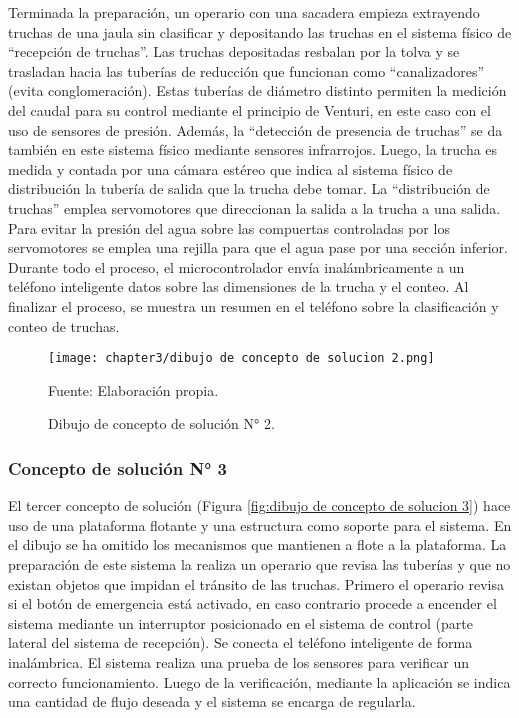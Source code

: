 Terminada la preparación, un operario con una sacadera empieza extrayendo truchas de una jaula sin clasificar y depositando las truchas en el sistema físico de “recepción de truchas”. Las truchas depositadas resbalan por la tolva y se trasladan hacia las tuberías de reducción que funcionan como “canalizadores” (evita conglomeración). Estas tuberías de diámetro distinto permiten la medición del caudal para su control mediante el principio de Venturi, en este caso con el uso de sensores de presión. Además, la “detección de presencia de truchas” se da también en este sistema físico mediante sensores infrarrojos. Luego, la trucha es medida y contada por una cámara estéreo que indica al sistema físico de distribución la tubería de salida que la trucha debe tomar. La “distribución de truchas” emplea servomotores que direccionan la salida a la trucha a una salida. Para evitar la presión del agua sobre las compuertas controladas por los servomotores se emplea una rejilla para que el agua pase por una sección inferior. 
Durante todo el proceso, el microcontrolador envía inalámbricamente a un teléfono inteligente datos sobre las dimensiones de la trucha y el conteo. Al finalizar el proceso, se muestra un resumen en el teléfono sobre la clasificación y conteo de truchas.

\begin{figure}[H]
	\centering
	\texttt{[image: chapter3/dibujo de concepto de solucion 2.png]}
	\caption{Dibujo de concepto de solución N° 2.}
	Fuente: Elaboración propia.
	\label{fig:dibujo de concepto de solucion 2}
\end{figure}

\subsubsection{Concepto de solución N° 3}

El tercer concepto de solución (Figura \ref{fig:dibujo de concepto de solucion 3}) hace uso de una plataforma flotante y una estructura como soporte para el sistema. En el dibujo se ha omitido los mecanismos que mantienen a flote a la plataforma. La preparación de este sistema la realiza un operario que revisa las tuberías y que no existan objetos que impidan el tránsito de las truchas. Primero el operario revisa si el botón de emergencia está activado, en caso contrario procede a encender el sistema mediante un interruptor posicionado en el sistema de control (parte lateral del sistema de recepción). Se conecta el teléfono inteligente de forma inalámbrica. El sistema realiza una prueba de los sensores para verificar un correcto funcionamiento. Luego de la verificación, mediante la aplicación se indica una cantidad de flujo deseada y el sistema se encarga de regularla.


